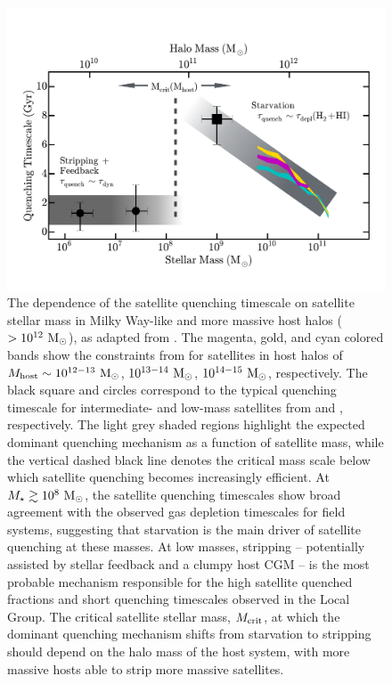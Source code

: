 \documentclass[usenatbib]{mn2e}
\newcommand{\mstar}{{M}_{\star}}
\newcommand{\msun}{{\rm M}_{\odot}}
\begin{document}


\begin{figure}
 \centering
 \hspace*{-0.2in}
   \includegraphics[width=6in]{f8.pdf}
   \caption{The dependence of the satellite quenching timescale on
     satellite stellar mass in Milky Way-like and more massive host
     halos ($>10^{12}~\msun$), as adapted from \citet{fham15}. The
     magenta, gold, and cyan colored bands show the constraints from
     \citet{wetzel13} for satellites in host halos of $M_{\rm host}
     \sim 10^{12-13}~\msun$, $10^{13-14}~\msun$, $10^{14-15}~\msun$,
     respectively. The black square and circles correspond to the
     typical quenching timescale for intermediate- and low-mass
     satellites from \citet{wheeler14} and \citet{fham15},
     respectively. The light grey shaded regions highlight the
     expected dominant quenching mechanism as a function of satellite
     mass, while the vertical dashed black line denotes the critical
     mass scale below which satellite quenching becomes increasingly
     efficient. At $\mstar \gtrsim10^{8}~\msun$, the satellite
     quenching timescales show broad agreement with the observed gas
     depletion timescales for field systems, suggesting that
     starvation is the main driver of satellite quenching at these
     masses. 
     At low masses, stripping -- potentially assisted by
     stellar feedback and a clumpy host CGM -- is the most probable
     mechanism responsible for the high satellite quenched fractions
     and short quenching timescales observed in the Local Group.
     The critical satellite stellar mass, $M_{\rm crit}$, at which the
     dominant quenching mechanism shifts from starvation to stripping
     should depend on the halo mass of the host system, with more
     massive hosts able to strip more massive satellites. }
 \label{fig:model}
\end{figure}
\end{document}
